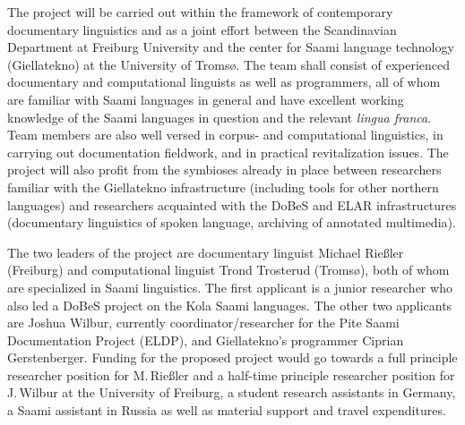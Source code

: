 \documentclass[a4paper,12pt]{article}
\begin{document}
The project will be carried out within the framework of contemporary documentary linguistics and as a joint effort between the Scandinavian Department at Freiburg University and the center for Saami language technology (Giellatekno) at the University of Tromsø.
The team shall consist of experienced documentary and computational linguists as well as programmers, all of whom are familiar with Saami languages in general and have excellent working knowledge of the Saami languages in question and the relevant \textit{lingua franca}. Team members are also well versed in corpus- and computational linguistics, in carrying out documentation fieldwork, and in practical revitalization issues. The project will also profit from the symbioses already in place between researchers familiar with the Giellatekno infrastructure (including tools for other northern languages) and researchers acquainted with the DoBeS and ELAR infrastructures (documentary linguistics of spoken language, archiving of annotated multimedia).

The two leaders of the project are documentary linguist Michael Rießler (Freiburg) and computational linguist Trond Trosterud (Tromsø), both of whom are specialized in Saami linguistics. The first applicant is a junior researcher who also led a DoBeS project on the Kola Saami languages. The other two applicants are Joshua Wilbur, currently coordinator/researcher for the Pite Saami Documentation Project (ELDP), and Giellatekno's programmer Ciprian Gerstenberger. Funding for the proposed project would go towards a full principle researcher position for M.\,Rießler and a half-time principle researcher position for J.\,Wilbur at the University of Freiburg, a student research assistants in Germany, a Saami assistant in Russia as well as material support and travel expenditures.
\end{document}
